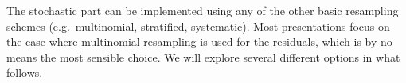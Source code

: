 The stochastic part can be implemented using any of the other basic resampling schemes (e.g.\ multinomial, stratified, systematic). Most presentations focus on the case where multinomial resampling is used for the residuals, which is by no means the most sensible choice. We will explore several different options in what follows.


